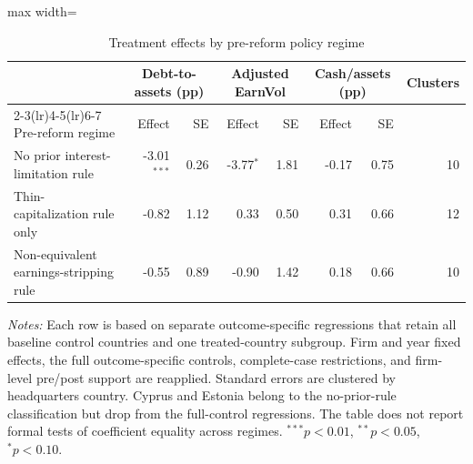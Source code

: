 \begin{table}[H]
    \caption{Treatment effects by pre-reform policy regime}
    \label{tab:robustness_regimes}
    \centering
    \footnotesize
    \begin{adjustbox}{max width=\textwidth}
    \begin{tabular}{lrrrrrrr}
        \toprule
        & \multicolumn{2}{c}{Debt-to-assets (pp)} & \multicolumn{2}{c}{Adjusted EarnVol} & \multicolumn{2}{c}{Cash/assets (pp)} & Clusters \\
        \cmidrule(lr){2-3}\cmidrule(lr){4-5}\cmidrule(lr){6-7}
        Pre-reform regime & Effect & SE & Effect & SE & Effect & SE & \\
        \midrule
        No prior interest-limitation rule & -3.01\(^{***}\) & 0.26 & -3.77\(^{*}\) & 1.81 & -0.17 & 0.75 & 10 \\
        Thin-capitalization rule only & -0.82 & 1.12 & 0.33 & 0.50 & 0.31 & 0.66 & 12 \\
        Non-equivalent earnings-stripping rule & -0.55 & 0.89 & -0.90 & 1.42 & 0.18 & 0.66 & 10 \\
        \bottomrule
    \end{tabular}
    \end{adjustbox}
    \parbox{\textwidth}{\vspace{0.35em}\footnotesize\textit{Notes:} Each row is based on separate outcome-specific regressions that retain all baseline control countries and one treated-country subgroup. Firm and year fixed effects, the full outcome-specific controls, complete-case restrictions, and firm-level pre/post support are reapplied. Standard errors are clustered by headquarters country. Cyprus and Estonia belong to the no-prior-rule classification but drop from the full-control regressions. The table does not report formal tests of coefficient equality across regimes. \(^{***}p<0.01\), \(^{**}p<0.05\), \(^{*}p<0.10\).}
\end{table}
